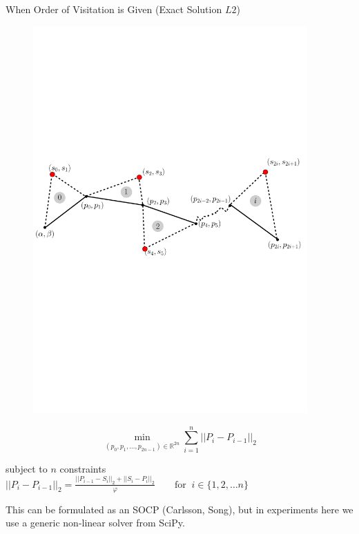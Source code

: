 \documentclass{beamer}
\begin{document}
\begin{frame}{When Order of Visitation is Given (Exact Solution $L2$)}
  \vspace{-14pt}
  \begin{figure}[H]
    \centering
    \includegraphics[width=10.5cm]{../img/lpdescr.pdf}
  \end{figure}
  \vspace{-10pt}
  \tiny{$$\displaystyle \min_{(p_0,p_1,\ldots,p_{2n-1}) \in \mathbb{R}^{2n}}  \sum_{i=1}^{n}  || P_i - P_{i-1} ||_2$$}

\vspace{-7pt}
subject to \(n\) constraints \\

\hspace{40pt}$||P_{i}-P_{i-1}||_2=\frac{ || P_{i-1}-S_{i}||_2 + ||S_{i}-P_{i}||_2}{\varphi}\qquad \text{for} \;\; i \in \{1,2,\ldots n\}$

 \begin{center}
     \large {\color{byzantine} This can be formulated as an SOCP (Carlsson, Song), but in experiments here we use a generic non-linear solver from SciPy. } \normalsize
  \end{center}


\end{frame}
\end{document}
